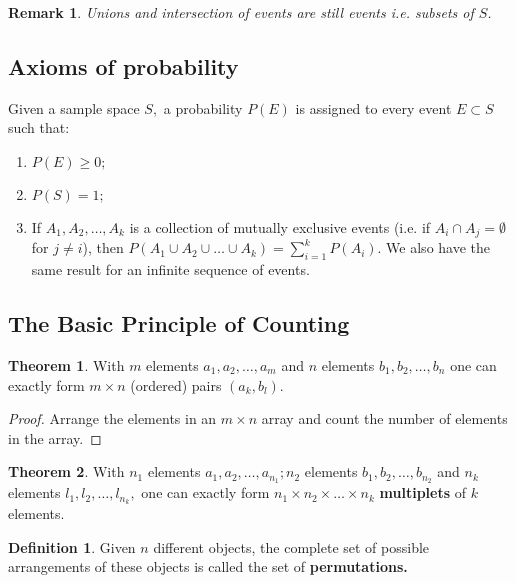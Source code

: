 \documentclass[12pt, a4paper]{article}
\newtheorem*{remark}{Remark}
\theoremstyle{definition}
\newtheorem{definition}{Definition}[section]
\newtheorem{theorem}{Theorem}[section]
\theoremstyle{plain}
\begin{document}
\begin{remark}
Unions and intersection of events are still events i.e. subsets of $S$.
\end{remark}


\subsection*{Axioms of probability}

Given a sample space $S,$ a probability $P(E)$ is assigned to every event $E \subset S$ such that:

\begin{enumerate}
	
	\item $P(E) \geq 0;$

	\item $P(S) = 1;$

	\item If $A_1,A_2,\ldots,A_k$ is a collection of mutually exclusive events (i.e. if $A_i\cap A_j = \emptyset$ for $j \neq i$), then $P(A_1\cup A_2\cup\ldots\cup A_k) = \sum_{i=1}^{k} P(A_i).$ We also have the same result for an infinite sequence of events.

\end{enumerate}

\subsection{The Basic Principle of Counting}

\begin{theorem}
With $m$ elements $a_1,a_2,\ldots,a_m$ and $n$ elements $b_1,b_2,\ldots,b_n$ one can exactly form $m \times n$ (ordered) pairs $(a_k,b_l).$
\end{theorem}

\begin{proof}
Arrange the elements in an $m \times n$ array and count the number of elements in the array.
\end{proof}

\begin{theorem}
With $n_1$ elements $a_1,a_2,\ldots,a_{n_1}; n_2$ elements $b_1,b_2,\ldots,b_{n_2}$ and $n_k$ elements $l_1,l_2,\ldots,l_{n_k},$ one can exactly form $n_1 \times n_2 \times \ldots \times n_k$ \textbf{multiplets} of $k$ elements. 
\end{theorem}

\begin{definition}
Given $n$ different objects, the complete set of possible arrangements of these objects is called the set of \textbf{permutations.}
\end{definition}
\end{document}
